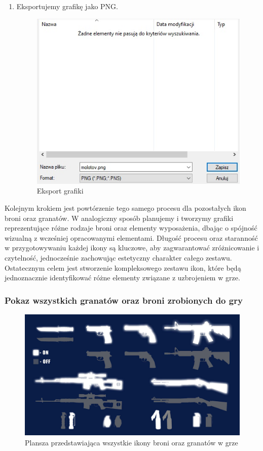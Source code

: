 \begin{enumerate}
  \item Eksportujemy grafikę jako PNG.
\begin{figure}[h]
    \centering
    \includegraphics[scale=0.7]{Images/Saving.jpg}
    \caption{Eksport grafiki}
    \label{fig:visBuglist}
\end{figure}
\FloatBarrier
\end{enumerate}

Kolejnym krokiem jest powtórzenie tego samego procesu dla pozostałych ikon broni oraz granatów. W analogiczny sposób planujemy i tworzymy grafiki reprezentujące różne rodzaje broni oraz elementy wyposażenia, dbając o spójność wizualną z wcześniej opracowanymi elementami. Długość procesu oraz staranność w przygotowywaniu każdej ikony są kluczowe, aby zagwarantować zróżnicowanie i czytelność, jednocześnie zachowując estetyczny charakter całego zestawu. Ostatecznym celem jest stworzenie kompleksowego zestawu ikon, które będą jednoznacznie identyfikować różne elementy związane z uzbrojeniem w grze.

\subsubsection{Pokaz wszystkich granatów oraz broni zrobionych do gry}

\begin{figure}[h]
    \centering
    \includegraphics[scale=0.2]{Images/Pokazanie ikon broni.jpg}
    \caption{Plansza przedstawiająca wszystkie ikony broni oraz granatów w grze}
    \label{fig:visBuglist}
\end{figure}
\FloatBarrier

